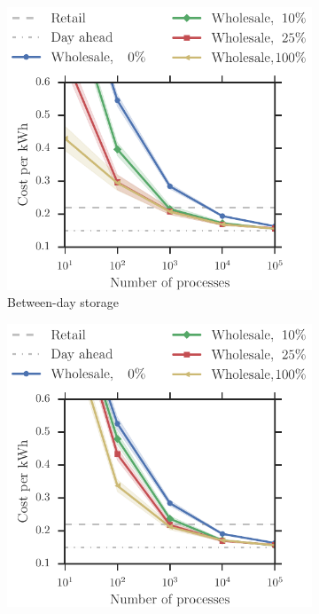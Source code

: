 \documentclass[conference]{IEEEtran}
\begin{document}
\begin{figure}[t!]
\centering
	\begin{subfigure}[b]{0.32\textwidth}
	\includegraphics[width=1.0\textwidth]{figures/Wholesale.pdf}
        \caption{Between-day storage}
        \label{fig:wholesale}
    \end{subfigure}
   	\begin{subfigure}[b]{0.32\textwidth}
	\includegraphics[width=1.0\textwidth]{figures/Wholesale_flex.pdf}

\end{subfigure}
\end{figure}
\end{document}
